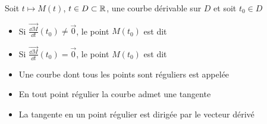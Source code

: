 \begin{frame}
Soit $t\mapsto M(t)$, $t\in D\subset\mathbb{R}$, une courbe dérivable sur 
$D$ et soit $t_0 \in D$
\begin{mydefinition}

\begin{itemize}
  \item Si $\overrightarrow{\frac{\dd M}{\dd t}}(t_0)\neq\vec{0}$, 
le point $M(t_0)$ est dit 
 
 \medskip
 \pause
 
  \item Si $\overrightarrow{\frac{\dd M}{\dd t}}(t_0)=\vec{0}$, 
  le point $M(t_0)$ est dit 
  
  \medskip
 \pause 
  
  \item Une courbe dont tous les points sont réguliers est 
appelée   


\end{itemize} 
\end{mydefinition}

\end{frame}


\begin{frame}
\begin{theoreme}
\begin{itemize}
  \item En tout point régulier la courbe admet une tangente
  
  \item La tangente en un point régulier est dirigée par le vecteur dérivé
\end{itemize}
\end{theoreme}


\pause


\end{frame}


